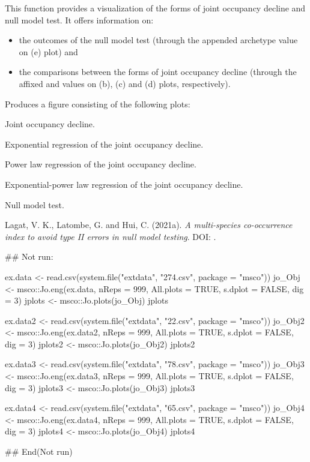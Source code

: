 \documentclass[a4paper]{book}
\begin{document}
%
\begin{Details}\relax
This function provides a visualization of the forms of joint
occupancy decline and null model test. It offers information on:
\begin{itemize}

\item{} the outcomes of the null model test (through the appended
archetype value on (e) plot) and
\item{} the comparisons between the forms of joint occupancy decline (through
the affixed  and  values on (b), (c) and (d) plots,
respectively).

\end{itemize}

\end{Details}
%
\begin{Value}
Produces a figure consisting of the following plots:
\begin{ldescription}
\item[\code{(a)}] Joint occupancy decline.
\item[\code{(b)}] Exponential regression of the joint occupancy decline.
\item[\code{(c)}] Power law regression of the joint occupancy decline.
\item[\code{(d)}] Exponential-power law regression of the joint occupancy decline.
\item[\code{(e)}] Null model test.
\end{ldescription}
\end{Value}
%
\begin{References}\relax
Lagat, V. K., Latombe, G. and Hui, C. (2021a). \emph{A multi-species co-occurrence
index to avoid type II errors in null model testing}. DOI: .
\end{References}
%
\begin{Examples}
\begin{ExampleCode}
## Not run: 

ex.data <- read.csv(system.file("extdata", "274.csv", package = "msco"))
jo_Obj <- msco::Jo.eng(ex.data, nReps = 999, All.plots = TRUE, s.dplot = FALSE, dig = 3)
jplots <- msco::Jo.plots(jo_Obj)
jplots

ex.data2 <- read.csv(system.file("extdata", "22.csv", package = "msco"))
jo_Obj2 <- msco::Jo.eng(ex.data2, nReps = 999, All.plots = TRUE, s.dplot = FALSE, dig = 3)
jplots2 <- msco::Jo.plots(jo_Obj2)
jplots2

ex.data3 <- read.csv(system.file("extdata", "78.csv", package = "msco"))
jo_Obj3 <- msco::Jo.eng(ex.data3, nReps = 999, All.plots = TRUE, s.dplot = FALSE, dig = 3)
jplots3 <- msco::Jo.plots(jo_Obj3)
jplots3

ex.data4 <- read.csv(system.file("extdata", "65.csv", package = "msco"))
jo_Obj4 <- msco::Jo.eng(ex.data4, nReps = 999, All.plots = TRUE, s.dplot = FALSE, dig = 3)
jplots4 <- msco::Jo.plots(jo_Obj4)
jplots4


## End(Not run)
\end{ExampleCode}
\end{Examples}
\end{document}
